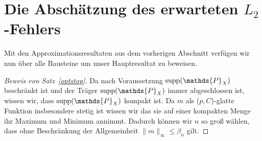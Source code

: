 \section{Die Abschätzung des erwarteten $L_2$-Fehlers}
Mit den Approximationsresultaten aus dem vorherigen Abschnitt verfügen wir nun über alle Bausteine um unser Hauptresultat zu beweisen.
\begin{proof}[Beweis von Satz~\ref{optstop}]
Da nach Voraussetzung $\supp(\mathds{P}_X)$ beschränkt ist und der Träger $\supp(\mathds{P}_X)$ immer abgeschlossen ist, wissen wir, dass $\supp(\mathds{P}_X)$ kompakt ist. Da $m$ als ($p,C$)-glatte Funktion insbesondere stetig ist wissen wir das sie auf einer kompakten Menge ihr Maximum und Minimum annimmt. Dadurch können wir $n$ so groß wählen, dass ohne Beschränkung der Allgemeinheit $\|m\|_{\infty} \leq \beta_n$ gilt.


\end{proof}
